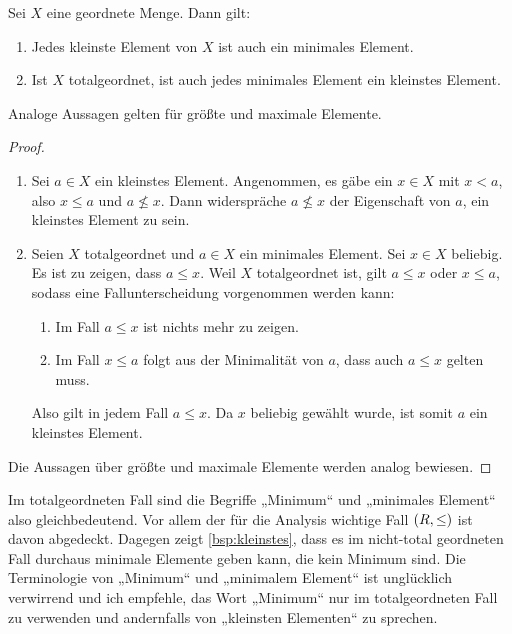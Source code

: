 \begin{satz} \label{kleinvsmin}
    Sei $X$ eine geordnete Menge. Dann gilt:
    \begin{enumerate}
        \item Jedes kleinste Element von $X$ ist auch ein minimales Element.
        \item Ist $X$ totalgeordnet, ist auch jedes minimales Element ein kleinstes Element.
    \end{enumerate}
    Analoge Aussagen gelten für größte und maximale Elemente.
\end{satz}
\begin{proof} \quad
    \begin{enumerate}
        \item Sei $a\in X$ ein kleinstes Element. Angenommen, es gäbe ein $x\in X$ mit $x<a$, also $x\le a$ und $a\not\le x$. Dann widerspräche $a\not\le x$ der Eigenschaft von $a$, ein kleinstes Element zu sein.
        \item Seien $X$ totalgeordnet und $a\in X$ ein minimales Element. Sei $x\in X$ beliebig. Es ist zu zeigen, dass $a\le x$. Weil $X$ totalgeordnet ist, gilt $a\le x$ oder $x\le a$, sodass eine Fallunterscheidung vorgenommen werden kann:
        \begin{enumerate}[1)]
            \item Im Fall $a\le x$ ist nichts mehr zu zeigen.
            \item Im Fall $x\le a$ folgt aus der Minimalität von $a$, dass auch $a\le x$ gelten muss.
        \end{enumerate}
        Also gilt in jedem Fall $a\le x$. Da $x$ beliebig gewählt wurde, ist somit $a$ ein kleinstes Element.
    \end{enumerate}
    Die Aussagen über größte und maximale Elemente werden analog bewiesen.
\end{proof}


\begin{bem}
    Im totalgeordneten Fall sind die Begriffe „Minimum“ und „minimales Element“ also gleichbedeutend. Vor allem der für die Analysis wichtige Fall $(\relax R,\le)$ ist davon abgedeckt. Dagegen zeigt \cref{bsp:kleinstes}, dass es im nicht-total geordneten Fall durchaus minimale Elemente geben kann, die kein Minimum sind. Die Terminologie von „Minimum“ und „minimalem Element“ ist unglücklich verwirrend und ich empfehle, das Wort „Minimum“ nur im totalgeordneten Fall zu verwenden und andernfalls von „kleinsten Elementen“ zu sprechen.
\end{bem}


